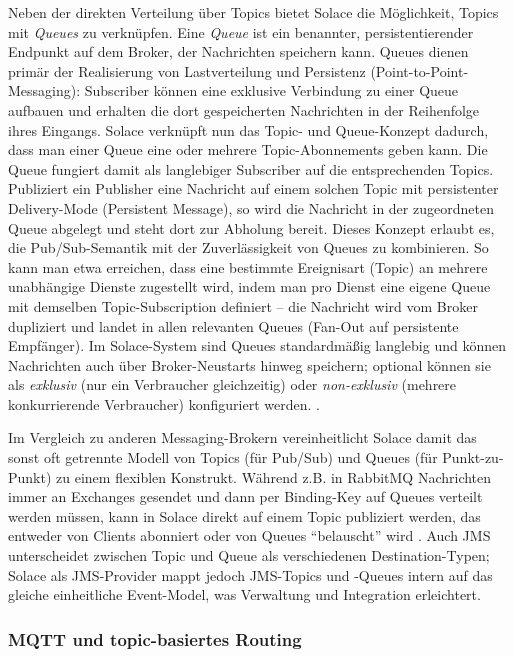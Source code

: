Neben der direkten Verteilung über Topics bietet Solace die Möglichkeit, Topics mit \textit{Queues} zu verknüpfen. Eine \textit{Queue} ist ein benannter, persistentierender Endpunkt auf dem Broker, der Nachrichten speichern kann. Queues dienen primär der Realisierung von Lastverteilung und Persistenz (Point-to-Point-Messaging): Subscriber können eine exklusive Verbindung zu einer Queue aufbauen und erhalten die dort gespeicherten Nachrichten in der Reihenfolge ihres Eingangs. Solace verknüpft nun das Topic- und Queue-Konzept dadurch, dass man einer Queue eine oder mehrere Topic-Abonnements geben kann. Die Queue fungiert damit als langlebiger Subscriber auf die entsprechenden Topics. Publiziert ein Publisher eine Nachricht auf einem solchen Topic mit persistenter Delivery-Mode (Persistent Message), so wird die Nachricht in der zugeordneten Queue abgelegt und steht dort zur Abholung bereit. Dieses Konzept erlaubt es, die Pub/Sub-Semantik mit der Zuverlässigkeit von Queues zu kombinieren. So kann man etwa erreichen, dass eine bestimmte Ereignisart (Topic) an mehrere unabhängige Dienste zugestellt wird, indem man pro Dienst eine eigene Queue mit demselben Topic-Subscription definiert – die Nachricht wird vom Broker dupliziert und landet in allen relevanten Queues (Fan-Out auf persistente Empfänger). Im Solace-System sind Queues standardmäßig langlebig und können Nachrichten auch über Broker-Neustarts hinweg speichern; optional können sie als \textit{exklusiv} (nur ein Verbraucher gleichzeitig) oder \textit{non-exklusiv} (mehrere konkurrierende Verbraucher) konfiguriert werden. \cite{SolaceTopicWildcard}.

Im Vergleich zu anderen Messaging-Brokern vereinheitlicht Solace damit das sonst oft getrennte Modell von Topics (für Pub/Sub) und Queues (für Punkt-zu-Punkt) zu einem flexiblen Konstrukt. Während z.B. in RabbitMQ Nachrichten immer an Exchanges gesendet und dann per Binding-Key auf Queues verteilt werden müssen, kann in Solace direkt auf einem Topic publiziert werden, das entweder von Clients abonniert oder von Queues “belauscht” wird \cite{SolaceTopicWildcard}. Auch JMS unterscheidet zwischen Topic und Queue als verschiedenen Destination-Typen; Solace als JMS-Provider mappt jedoch JMS-Topics und -Queues intern auf das gleiche einheitliche Event-Model, was Verwaltung und Integration erleichtert.

\subsubsection{MQTT und topic-basiertes Routing}

